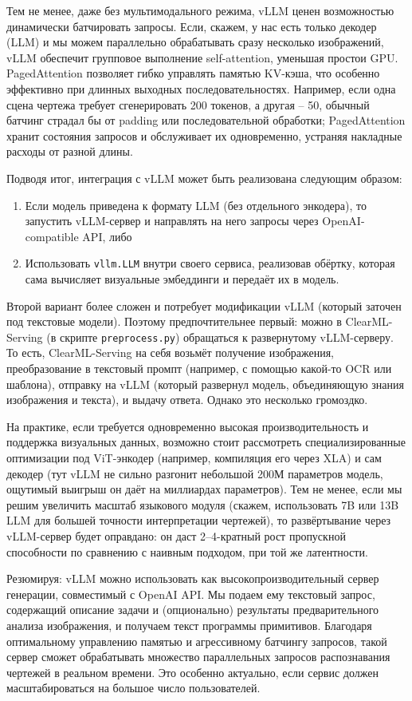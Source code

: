 \documentclass{article}
\begin{document}
Тем не менее, даже без мультимодального режима, vLLM ценен возможностью динамически батчировать запросы. Если, скажем, у нас есть только декодер (LLM) и мы можем параллельно обрабатывать сразу несколько изображений, vLLM обеспечит групповое выполнение self-attention, уменьшая простои GPU. PagedAttention позволяет гибко управлять памятью KV-кэша, что особенно эффективно при длинных выходных последовательностях. Например, если одна сцена чертежа требует сгенерировать 200 токенов, а другая – 50, обычный батчинг страдал бы от padding или последовательной обработки; PagedAttention хранит состояния запросов и обслуживает их одновременно, устраняя накладные расходы от разной длины.

Подводя итог, интеграция с vLLM может быть реализована следующим образом:
\begin{enumerate}
\item Если модель приведена к формату LLM (без отдельного энкодера), то запустить vLLM-сервер и направлять на него запросы через OpenAI-compatible API, либо
\item Использовать \texttt{vllm.LLM} внутри своего сервиса, реализовав обёртку, которая сама вычисляет визуальные эмбеддинги и передаёт их в модель.
\end{enumerate}
Второй вариант более сложен и потребует модификации vLLM (который заточен под текстовые модели). Поэтому предпочтительнее первый: можно в ClearML-Serving (в скрипте \texttt{preprocess.py}) обращаться к развернутому vLLM-серверу. То есть, ClearML-Serving на себя возьмёт получение изображения, преобразование в текстовый промпт (например, с помощью какой-то OCR или шаблона), отправку на vLLM (который развернул модель, объединяющую знания изображения и текста), и выдачу ответа. Однако это несколько громоздко.

На практике, если требуется одновременно высокая производительность и поддержка визуальных данных, возможно стоит рассмотреть специализированные оптимизации под ViT-энкодер (например, компиляция его через XLA) и сам декодер (тут vLLM не сильно разгонит небольшой 200М параметров модель, ощутимый выигрыш он даёт на миллиардах параметров). Тем не менее, если мы решим увеличить масштаб языкового модуля (скажем, использовать 7B или 13B LLM для большей точности интерпретации чертежей), то развёртывание через vLLM-сервер будет оправдано: он даст 2–4-кратный рост пропускной способности по сравнению с наивным подходом, при той же латентности.

Резюмируя: vLLM можно использовать как высокопроизводительный сервер генерации, совместимый с OpenAI API. Мы подаем ему текстовый запрос, содержащий описание задачи и (опционально) результаты предварительного анализа изображения, и получаем текст программы примитивов. Благодаря оптимальному управлению памятью и агрессивному батчингу запросов, такой сервер сможет обрабатывать множество параллельных запросов распознавания чертежей в реальном времени. Это особенно актуально, если сервис должен масштабироваться на большое число пользователей.
\end{document}
